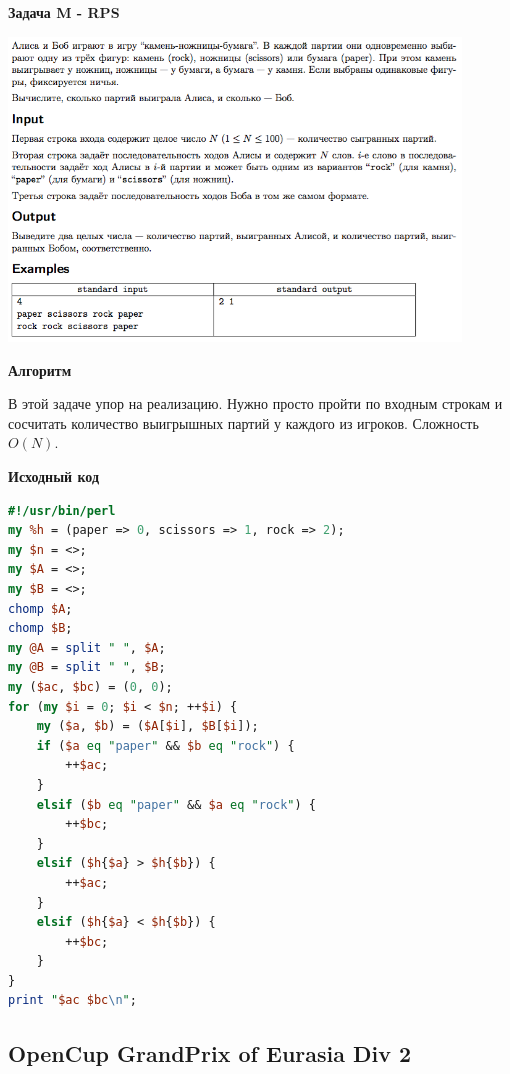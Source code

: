 \documentclass[a4paper,12pt]{article}
\begin{document}
\newpage
\textbf{{\large Задача M - RPS}} \\

\begin{center}
\includegraphics[width=0.9\textwidth]{OC_Japan/M.png}\\ [1cm]
\end{center}

\textbf{{\large Алгоритм}}

В этой задаче упор на реализацию. Нужно просто пройти по входным строкам и сосчитать количество выигрышных партий у каждого из игроков. Сложность $O(N)$.

\newpage
\textbf{{\large Исходный код}} \\
\begin{lstlisting}[language=Perl]
#!/usr/bin/perl
my %h = (paper => 0, scissors => 1, rock => 2);
my $n = <>;
my $A = <>;
my $B = <>;
chomp $A;
chomp $B;
my @A = split " ", $A;
my @B = split " ", $B;
my ($ac, $bc) = (0, 0);
for (my $i = 0; $i < $n; ++$i) {
	my ($a, $b) = ($A[$i], $B[$i]);
	if ($a eq "paper" && $b eq "rock") {
		++$ac;
	}
	elsif ($b eq "paper" && $a eq "rock") {
		++$bc;
	}
	elsif ($h{$a} > $h{$b}) {
		++$ac;
	}
	elsif ($h{$a} < $h{$b}) {
		++$bc;
	}
}
print "$ac $bc\n";
\end{lstlisting}



%
%

\newpage
\subsection{OpenCup GrandPrix of Eurasia Div 2}
\end{document}
